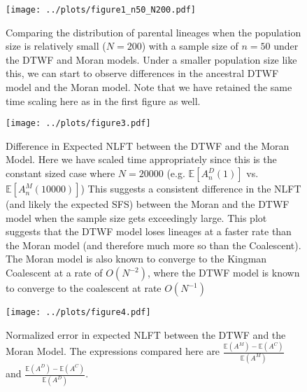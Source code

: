 \documentclass[10.5pt]{article}
\begin{document}
\begin{figure}[H]
	\centering
	\captionsetup{width=0.75\textwidth}
	\texttt{[image: ../plots/figure1\_n50\_N200.pdf]}
	\caption{Comparing the distribution of parental lineages when the population size is relatively small ($N = 200$) with a sample size of $n=50$ under the DTWF and Moran models. Under a smaller population size like this, we can start to observe differences in the ancestral DTWF model and the Moran model. Note that we have retained the same time scaling here as in the first figure as well.}
\end{figure}\label{fig:2}


\begin{figure}[H]
	\centering
	\captionsetup{width=0.75\textwidth}
	\texttt{[image: ../plots/figure3.pdf]}
	\caption{Difference in Expected NLFT between the DTWF and the Moran Model. Here we have scaled time appropriately since this is the constant sized case where $N=20000$ (e.g. $\mathbb{E}[A_n^D(1)]$ vs. $\mathbb{E}[A_n^{M}(10000)]$) This suggests a consistent difference in the NLFT (and likely the expected SFS) between the Moran and the DTWF model when the sample size gets exceedingly large. This plot suggests that the DTWF model loses lineages at a faster rate than the Moran model (and therefore much more so than the Coalescent). The Moran model is also known to converge to the Kingman Coalescent at a rate of $O(N^{-2})$, where the DTWF model is known to converge to the coalescent at rate $O(N^{-1})$}
\end{figure}\label{fig:3}


\begin{figure}[H]
	\centering
	\captionsetup{width=0.75\textwidth}
	\texttt{[image: ../plots/figure4.pdf]}
	\caption{Normalized error in expected NLFT between the DTWF and the Moran Model. The expressions compared here are $\frac{\mathbb{E}(A^M) - \mathbb{E}(A^C)}{\mathbb{E}(A^M)}$ and $\frac{\mathbb{E}(A^D) - \mathbb{E}(A^C)}{\mathbb{E}(A^D)}$.}
\end{figure}\label{fig:4}
\end{document}
